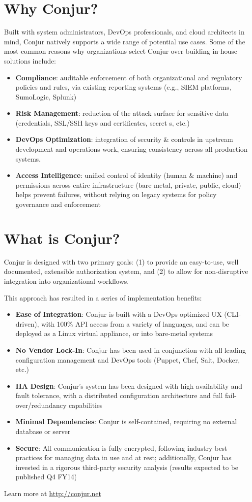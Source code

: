 \documentclass[10pt, a5paper]{article}
\begin{document}
\section*{Why Conjur? }
Built with system administrators, DevOps professionals, and cloud architects in mind, Conjur natively supports a wide range of potential use cases. Some of the most common reasons why organizations select Conjur over building in-house solutions include: 
\begin{itemize}
\item {\bf Compliance}: auditable enforcement of both organizational and regulatory policies and rules, via existing reporting systems (e.g., SIEM platforms, SumoLogic, Splunk) 
\item {\bf Risk Management}: reduction of the attack surface for sensitive data (credentials, SSL/SSH keys and certificates, secret s, etc.)
\item {\bf DevOps Optimization}: integration of security \& controls in upstream development and operations work, ensuring consistency across all production systems. 
\item {\bf Access Intelligence}: unified control of identity (human \& machi\-ne) and permissions across entire infrastructure (bare metal, pri\-vate, public, cloud) helps prevent failures, without relying on legacy systems for policy governance and enforcement 
\end{itemize}

\section*{What is Conjur?}


Conjur is designed with two primary goals: (1) to provide an easy-to-use, well documented, extensible authorization system, and (2) to allow for non-disruptive integration into organizati\-onal workflows. 

This approach has resulted in a series of implementation benefits: 
\begin{itemize}
\item {\bf Ease of Integration}: Conjur is built with a DevOps optimized UX (CLI-driven), with 100\% API access from a variety of langua\-ges, and can be deployed as a Linux virtual appliance, or into bare-metal systems 
\item {\bf No Vendor Lock-In}: Conjur has been used in conjunction with all leading configuration management and DevOps tools (Puppet, Chef, Salt, Docker, etc.) 
\item {\bf HA Design}: Conjur’s system has been designed with high availa\-bility and fault tolerance, with a distributed configuration archi\-tecture and full fail-over/redundancy capabilities 
\item {\bf Minimal Dependencies}: Conjur is self-contained, requiring no external database or server  
\item {\bf Secure}: All communication is fully encrypted, following industry best practices for managing data in use and at rest; additionally, Conjur has invested in a rigorous third-party security analysis (results expected to be published Q4 FY14)
\end{itemize}

Learn more at \url{http://conjur.net}
\end{document}
